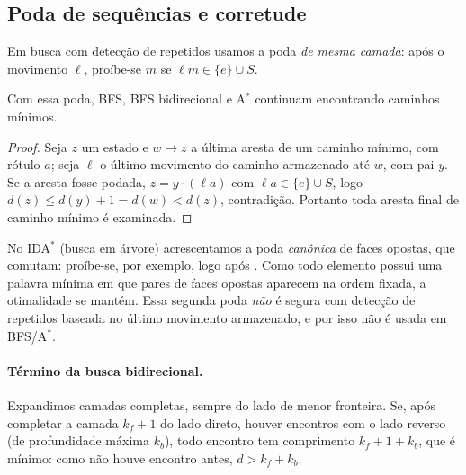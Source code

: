 \subsection{Poda de sequências e corretude}
Em busca com detecção de repetidos usamos a poda \emph{de mesma camada}: após o movimento $\ell$, proíbe-se $m$ se $\ell m\in\{e\}\cup S$.
\begin{proposition}\label{prop:poda}\proj
Com essa poda, BFS, BFS bidirecional e A$^*$ continuam encontrando caminhos mínimos.
\end{proposition}
\begin{proof}
Seja $z$ um estado e $w\to z$ a última aresta de um caminho mínimo, com rótulo $a$; seja $\ell$ o último movimento do caminho armazenado até $w$, com pai $y$. Se a aresta fosse podada, $z=y\cdot(\ell a)$ com $\ell a\in\{e\}\cup S$, logo $d(z)\le d(y)+1=d(w)<d(z)$, contradição. Portanto toda aresta final de caminho mínimo é examinada.
\end{proof}
\noindent No IDA$^*$ (busca em árvore) acrescentamos a poda \emph{canônica} de faces opostas, que comutam: proíbe-se, por exemplo,  logo após . Como todo elemento possui uma palavra mínima em que pares de faces opostas aparecem na ordem fixada, a otimalidade se mantém. Essa segunda poda \emph{não} é segura com detecção de repetidos baseada no último movimento armazenado, e por isso não é usada em BFS/A$^*$.

\paragraph{Término da busca bidirecional.} Expandimos camadas completas, sempre do lado de menor fronteira. Se, após completar a camada $k_f+1$ do lado direto, houver encontros com o lado reverso (de profundidade máxima $k_b$), todo encontro tem comprimento $k_f+1+k_b$, que é mínimo: como não houve encontro antes, $d>k_f+k_b$.
